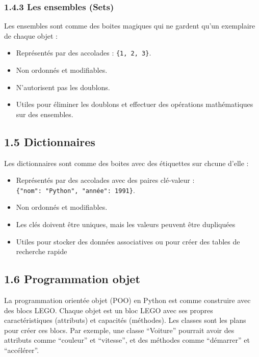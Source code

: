 \documentclass[
]{article}
\begin{document}
\subsubsection{\texorpdfstring{{1.4.3} Les ensembles
(Sets)}{1.4.3 Les ensembles (Sets)}}\label{les-ensembles-sets}

Les ensembles sont comme des boites magiques qui ne gardent qu'un
exemplaire de chaque objet :

\begin{itemize}
\item
  Représentés par des accolades : \texttt{\{1,\ 2,\ 3\}}.
\item
  Non ordonnés et modifiables.
\item
  N'autorisent pas les doublons.
\item
  Utiles pour éliminer les doublons et effectuer des opérations
  mathématiques sur des ensembles.
\end{itemize}

\subsection{\texorpdfstring{{1.5}
Dictionnaires}{1.5 Dictionnaires}}\label{dictionnaires}

Les dictionnaires sont comme des boites avec des étiquettes sur chcune
d'elle :

\begin{itemize}
\item
  Représentés par des accolades avec des paires clé-valeur :
  \texttt{\{"nom":\ "Python",\ "année":\ 1991\}}.
\item
  Non ordonnés et modifiables.
\item
  Les clés doivent être uniques, mais les valeurs peuvent être
  dupliquées
\item
  Utiles pour stocker des données associatives ou pour créer des tables
  de recherche rapide
\end{itemize}

\subsection{\texorpdfstring{{1.6} Programmation
objet}{1.6 Programmation objet}}\label{programmation-objet}

La programmation orientée objet (POO) en Python est comme construire
avec des blocs LEGO. Chaque objet est un bloc LEGO avec ses propres
caractéristiques (attributs) et capacités (méthodes). Les classes sont
les plans pour créer ces blocs. Par exemple, une classe ``Voiture''
pourrait avoir des attributs comme ``couleur'' et ``vitesse'', et des
méthodes comme ``démarrer'' et ``accélérer''.
\end{document}
